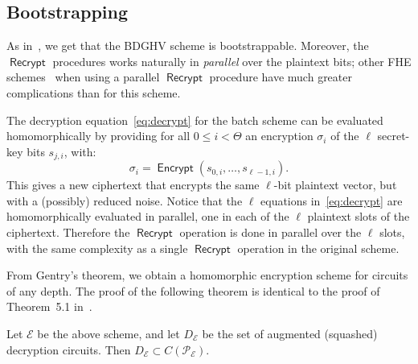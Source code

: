 \documentclass[11pt]{llncs}
\renewcommand\leq\leqslant
\DeclareMathOperator{\Encrypt}{\ensuremath{\mathsf{Encrypt}}}
\DeclareMathOperator{\Recrypt}{\ensuremath{\mathsf{Recrypt}}}
\newcommand\ignore[1]{}
\begin{document}
\subsection{Bootstrapping}\label{subsec:bootstrapping}

As in~\cite{vDGHV2010}, we get that the BDGHV scheme is
bootstrappable. Moreover, the $\Recrypt$ procedures works naturally in \emph{parallel} over the plaintext bits; other FHE schemes~\cite{SV2011,GHS2012a} when using
a parallel $\Recrypt$ procedure have much greater complications than for this
scheme.

\ignore{
In the original DGHV scheme, the decryption equation
was:
\begin{equation}
\label{eq:msz}
m \leftarrow\left[\left\lfloor\sum_{i=0}^{\Theta-1}
s_{i} \cdot z_{i}\right\rceil\right]_2 \oplus
(c \bmod 2) 
\end{equation}
and could be homomorphically evaluated by providing an
encryption $\sigma_i$ of every secret-key bit $s_i$; one would obtain a new
ciphertext which would encrypt the same plaintext bit $m$ but with a
possibly reduced noise.

Similarly, t}
The decryption equation~\eqref{eq:decrypt} for the batch
scheme can be evaluated homomorphically by providing   for
all $0 \leq i < \Theta$ an encryption $\sigma_i$ of the $\ell$
secret-key bits $s_{j,i}$, with:
\[ {\sigma}_i = \Encrypt(s_{0,i}, \ldots, s_{\ell-1,i}). \]
This gives a new
ciphertext that encrypts the same $\ell$-bit plaintext vector,
but with a (possibly) reduced noise.  \ignore{In other words, instead of having an
homomorphic evaluation of a single 
equation~\eqref{eq:msz}, we have} Notice that the $\ell$ equations 
in~\eqref{eq:decrypt} are homomorphically evaluated in parallel, one in
each of the $\ell$ 
 plaintext slots of the ciphertext. Therefore  the $\Recrypt$
operation is done in parallel over the 
$\ell$ slots, with the same complexity as a single $\Recrypt$
operation in the original scheme.

From Gentry's theorem, we obtain a homomorphic encryption scheme for
circuits of any depth. The proof of the following theorem is identical
to the proof of Theorem~5.1
in~\cite{CMNT2011}.

\begin{theorem}Let $\mathcal E$ be the above scheme, and let
  $D_{\mathcal E}$ be the set of augmented (squashed) decryption
  circuits. Then $D_{\mathcal E}\subset C(\mathcal{P_E})$. 
\end{theorem}
\end{document}
